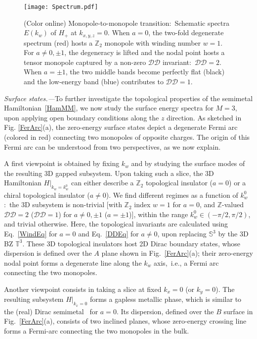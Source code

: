\documentclass[twocolumn,prl,10pt,superscriptaddress]{revtex4}
\begin{document}
\begin{figure}[htbp]\centering
\texttt{[image: Spectrum.pdf]}
 \caption{(Color online) Monopole-to-monopole transition:~Schematic spectra $E(k_w)$ of $H_+$ at $k_{x,y,z}=0$. When $a=0$, the two-fold degenerate spectrum (red) hosts a $\mathbb{Z}_2$ monopole with winding number $w=1$. For $a\neq 0,\pm1$, the degeneracy is lifted and the nodal point hosts a tensor monopole captured by a non-zero $\mathcal{DD}$ invariant:~$\mathcal{DD}\!=\!2$. When $a=\pm 1$, the two middle bands become perfectly flat (black) and the low-energy band (blue) contributes to $\mathcal{DD}\!=\!1$. } \label{Spectra}
\end{figure}

\emph{Surface states.---}To further investigate the topological properties of the semimetal Hamiltonian~\eqref{HamMM}, we now study the surface energy spectra for $M\!=\!3$, upon applying open boundary conditions along the $z$ direction. As sketched in Fig. \ref{FerArc}(a), the zero-energy surface states depict a degenerate Fermi arc (colored in red) connecting two monopoles of opposite charges.  The origin of this Fermi arc can be understood from two perspectives, as we now explain.

A first viewpoint is obtained by fixing $k_w$ and by studying the surface modes of the resulting 3D gapped subsystem. Upon taking such a slice, the 3D Hamiltonian $H|_{k_w=k_w^0}$ can either describe a $\mathbb{Z}_2$  topological insulator ($a=0$) or a chiral topological insulator ($a\neq 0$)\cite{Schnyder2008,Schnyder2009,Hosur2010,Neupert2012,STWang2014}. We find different regimes as a function of $k_w^0$:~the 3D subsystem is non-trivial [with $\mathbb{Z}_2$ index $w\!=\!1$ for $a\!=\!0$, and $\mathbb{Z}$-valued $\mathcal{DD}\!=\!2$ ($\mathcal{DD}=1$) for $a\!\neq\! 0,\pm 1$ ($a=\pm1$)], within the range $k_w^0\in (-\pi/2,\pi/2)$, and trivial otherwise. Here, the topological invariants are calculated using Eq.~\eqref{WindEq} for $a\!=\!0$ and Eq.~\eqref{DDEq} for $a\!\neq\! 0$, upon replacing $\mathbb{S}^3$ by the 3D BZ $\mathbb{T}^3$.
These 3D topological insulators host 2D Dirac boundary states, whose dispersion is defined over the $A$ plane shown in Fig.~\ref{FerArc}(a); their zero-energy nodal point forms a degenerate line along the $k_w$ axis,~i.e., a Fermi arc connecting the two monopoles.

 Another viewpoint consists in taking a slice at fixed $k_x\!=\!0$ (or $k_y\!=\!0$). The resulting subsystem $H|_{k_x=0}$ forms a gapless metallic phase, which is similar to the (real) Dirac semimetal~\cite{YXZhao2017} for $a\!=\!0$. Its dispersion, defined over the $B$ surface in Fig.~\ref{FerArc}(a), consists of two inclined planes, whose zero-energy crossing line forms a Fermi-arc connecting the two monopoles in the bulk.
\end{document}
